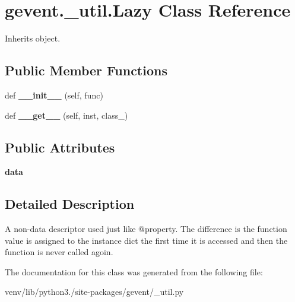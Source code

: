 \hypertarget{classgevent_1_1__util_1_1_lazy}{}\section{gevent.\+\_\+util.\+Lazy Class Reference}
\label{classgevent_1_1__util_1_1_lazy}


Inherits object.

\subsection*{Public Member Functions}
\begin{DoxyCompactItemize}
\item 
\mbox{\label{classgevent_1_1__util_1_1_lazy_a6dc2d98fc5cee5b329aacaaf41110f30}} 
def {\bfseries \+\_\+\+\_\+init\+\_\+\+\_\+} (self, func)
\item 
\mbox{\label{classgevent_1_1__util_1_1_lazy_a2d2605747bad0adad3f002551be9d66b}} 
def {\bfseries \+\_\+\+\_\+get\+\_\+\+\_\+} (self, inst, class\+\_\+)
\end{DoxyCompactItemize}
\subsection*{Public Attributes}
\begin{DoxyCompactItemize}
\item 
\mbox{\label{classgevent_1_1__util_1_1_lazy_a443143aacadb01d1b099628a5502f3f3}} 
{\bfseries data}
\end{DoxyCompactItemize}


\subsection{Detailed Description}
\begin{DoxyVerb}A non-data descriptor used just like @property. The
difference is the function value is assigned to the instance
dict the first time it is accessed and then the function is never
called agoin.
\end{DoxyVerb}
 

The documentation for this class was generated from the following file\+:\begin{DoxyCompactItemize}
\item 
venv/lib/python3./site-\/packages/gevent/\+\_\+util.\+py\end{DoxyCompactItemize}
